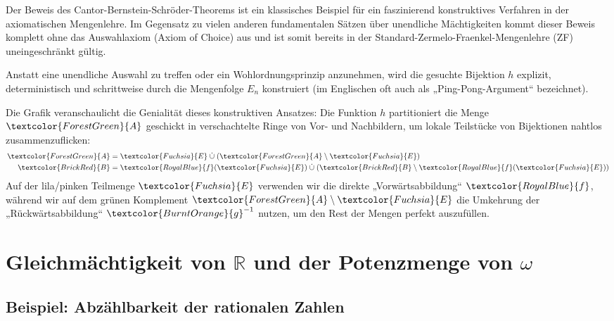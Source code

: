 \begin{didactic-insight}
Der Beweis des Cantor-Bernstein-Schröder-Theorems ist ein klassisches Beispiel für ein faszinierend konstruktives Verfahren in der axiomatischen Mengenlehre. Im Gegensatz zu vielen anderen fundamentalen Sätzen über unendliche Mächtigkeiten kommt dieser Beweis komplett ohne das Auswahlaxiom (Axiom of Choice) aus und ist somit bereits in der Standard-Zermelo-Fraenkel-Mengenlehre (ZF) uneingeschränkt gültig. 

Anstatt eine unendliche Auswahl zu treffen oder ein Wohlordnungsprinzip anzunehmen, wird die gesuchte Bijektion $h$ explizit, deterministisch und schrittweise durch die Mengenfolge $E_n$ konstruiert (im Englischen oft auch als „Ping-Pong-Argument“ bezeichnet).

Die Grafik veranschaulicht die Genialität dieses konstruktiven Ansatzes: Die Funktion $h$ partitioniert die Menge $\textcolor{ForestGreen}{A}$ geschickt in verschachtelte Ringe von Vor- und Nachbildern, um lokale Teilstücke von Bijektionen nahtlos zusammenzuflicken:
\begin{align*}
  \textcolor{ForestGreen}{A} &= \textcolor{Fuchsia}{E} \;\dot{\cup}\; (\textcolor{ForestGreen}{A} \setminus \textcolor{Fuchsia}{E}) \\
  \textcolor{BrickRed}{B} &= \textcolor{RoyalBlue}{f}(\textcolor{Fuchsia}{E}) \;\dot{\cup}\; (\textcolor{BrickRed}{B} \setminus \textcolor{RoyalBlue}{f}(\textcolor{Fuchsia}{E}))
\end{align*}
Auf der lila/pinken Teilmenge $\textcolor{Fuchsia}{E}$ verwenden wir die direkte „Vorwärtsabbildung“ $\textcolor{RoyalBlue}{f}$, während wir auf dem grünen Komplement $\textcolor{ForestGreen}{A} \setminus \textcolor{Fuchsia}{E}$ die Umkehrung der „Rückwärtsabbildung“ $\textcolor{BurntOrange}{g}^{-1}$ nutzen, um den Rest der Mengen perfekt auszufüllen.
\end{didactic-insight}

\section{Gleichmächtigkeit von \texorpdfstring{$\mathbb{R}$}{R} und der Potenzmenge von \texorpdfstring{$\omega$}{omega}}

\subsection{Beispiel: Abzählbarkeit der rationalen Zahlen}


